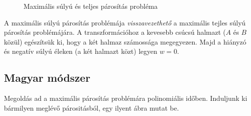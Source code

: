 \begin{figure}[htb]
\caption{Maximális súlyú és teljes párosítás probléma}
\label{fig:OptMaxNemEkv}
\centering
{} 
\end{figure}

A maximális súlyú párosítás problémája \emph{visszavezethető} a maximális tejles
súlyú párosítás problémájára. A transzformációhoz a kevesebb csúcsú halmazt ($A$
és $B$ közül) egészítsük ki, hogy a két halmaz számossága megegyezen. Majd a
hiányzó és negatív súlyú éleken (a két halmazt közt) legyen $w=0$. 

\subsection{Magyar módszer}

Megoldás ad a maximális párosítás problémára polinomiális időben. Induljunk ki
bármilyen meglévő párositásból, egy ilyent  ábra mutat
be.


